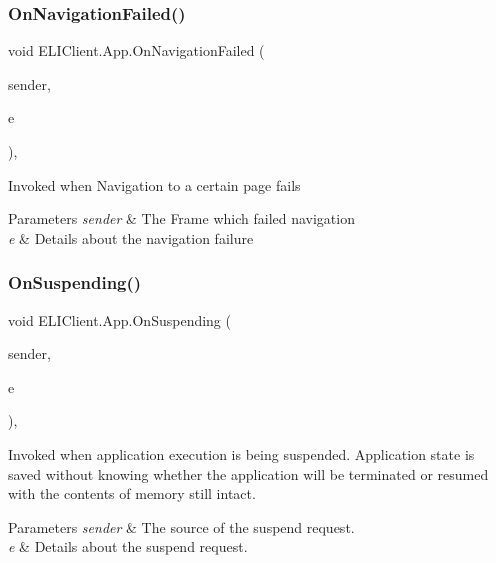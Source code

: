 \subsubsection{\texorpdfstring{On\+Navigation\+Failed()}{OnNavigationFailed()}}
{\footnotesize\ttfamily void E\+L\+I\+Client.\+App.\+On\+Navigation\+Failed (\begin{DoxyParamCaption}\item[{object}]{sender,  }\item[{Navigation\+Failed\+Event\+Args}]{e }\end{DoxyParamCaption})\hspace{0.3cm}{\ttfamily [inline]}, {\ttfamily [private]}}



Invoked when Navigation to a certain page fails 


\begin{DoxyParams}{Parameters}
{\em sender} & The Frame which failed navigation\\
\hline
{\em e} & Details about the navigation failure\\
\hline
\end{DoxyParams}
\mbox{\label{class_e_l_i_client_1_1_app_add9bb2e9df2fdb41f313d82ca31e9698}} 
\subsubsection{\texorpdfstring{On\+Suspending()}{OnSuspending()}}
{\footnotesize\ttfamily void E\+L\+I\+Client.\+App.\+On\+Suspending (\begin{DoxyParamCaption}\item[{object}]{sender,  }\item[{Suspending\+Event\+Args}]{e }\end{DoxyParamCaption})\hspace{0.3cm}{\ttfamily [inline]}, {\ttfamily [private]}}



Invoked when application execution is being suspended. Application state is saved without knowing whether the application will be terminated or resumed with the contents of memory still intact. 


\begin{DoxyParams}{Parameters}
{\em sender} & The source of the suspend request.\\
\hline
{\em e} & Details about the suspend request.\\
\hline
\end{DoxyParams}


